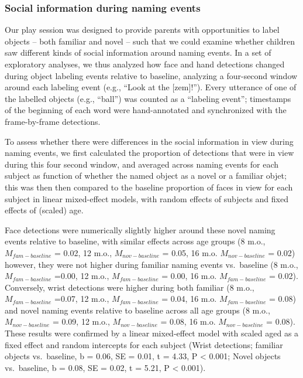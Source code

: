 \documentclass[english,man]{apa6}
\begin{document}
\subsubsection{Social information during naming
events}\label{social-information-during-naming-events}

Our play session was designed to provide parents with opportunities to
label objects -- both familiar and novel -- such that we could examine
whether children saw different kinds of social information around naming
events. In a set of exploratory analyses, we thus analyzed how face and
hand detections changed during object labeling events relative to
baseline, analyzing a four-second window around each labeling event
(e.g., \enquote{Look at the {[}zem{]}!}). Every utterance of one of the
labelled objects (e.g., \enquote{ball}) was counted as a
\enquote{labeling event}; timestamps of the beginning of each word were
hand-annotated and synchronized with the frame-by-frame detections.

To assess whether there were differences in the social information in
view during naming events, we first calculated the proportion of
detections that were in view during this four second window, and
averaged across naming events for each subject as function of whether
the named object as a novel or a familiar objet; this was then then
compared to the baseline proportion of faces in view for each subject in
linear mixed-effect models, with random effects of subjects and fixed
effects of (scaled) age.

Face detections were numerically slightly higher around these novel
naming events relative to baseline, with similar effects across age
groups (8 m.o., \(M_{fam - baseline}\) = 0.02, 12 m.o.,
\(M_{nov - baseline}\) = 0.05, 16 m.o. \(M_{nov - baseline}\) = 0.02)
however, they were not higher during familiar naming events vs.~baseline
(8 m.o., \(M_{fam - baseline}\) =0.00, 12 m.o., \(M_{fam - baseline}\) =
0.00, 16 m.o. \(M_{fam - baseline}\) = 0.02). Conversely, wrist
detections were higher during both familiar (8 m.o.,
\(M_{fam - baseline}\) =0.07, 12 m.o., \(M_{fam - baseline}\) = 0.04, 16
m.o. \(M_{fam - baseline}\) = 0.08) and novel naming events relative to
baseline across all age groups (8 m.o., \(M_{nov - baseline}\) = 0.09,
12 m.o., \(M_{nov - baseline}\) = 0.08, 16 m.o. \(M_{nov - baseline}\) =
0.08). These results were confirmed by a linear mixed-effect model with
scaled aged as a fixed effect and random intercepts for each subject
(Wrist detections; familiar objects vs.~baseline, b = 0.06, SE = 0.01, t
= 4.33, P \textless{} 0.001; Novel objects vs.~baseline, b = 0.08, SE =
0.02, t = 5.21, P \textless{} 0.001).
\end{document}
